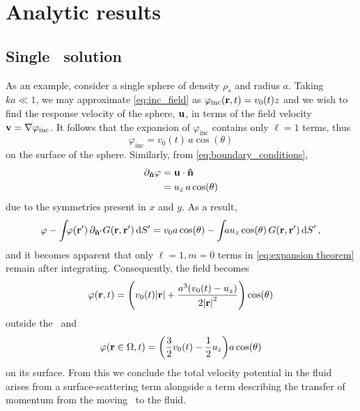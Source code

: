 \section{Analytic results}

\subsection{Single \bubble\ solution}

As an example, consider a single sphere of density $\rho_s$ and radius $a$.
Taking $k a \ll 1$, we may approximate \cref{eq:inc_field} as $\varphi_\text{inc}(\vb{r}, t) = v_0(t) z$ and we wish to find the response velocity of the sphere, $\vb{u}$, in terms of the field velocity $\vb{v} = \nabla \varphi_\text{inc}$. It follows that the expansion of $\varphi_\text{inc}$ contains only $\ell = 1$ terms, thus
\begin{equation}
  \label{eq:uniform field}
  \varphi_\text{inc} = v_0(t) \, a \cos(\theta)
\end{equation}
on the surface of the sphere. Similarly, from \cref{eq:boundary_conditions},
\begin{align}
  \partial_{\vu{n}} \varphi &= \vb{u} \cdot \vu{n} \nonumber \\
                            &= u_z \, a \cos(\theta)
\end{align}
due to the symmetries present in $x$ and $y$.
As a result,
\begin{equation}
  \varphi - \int_{} \varphi(\vb{r}') \, \partial_{\vu{n}'} G(\vb{r}, \vb{r}') \dd{S'} = v_0 a \cos(\theta) - \int_{} a u_z \cos(\theta) \, G(\vb{r}, \vb{r}') \dd{S}',
\end{equation}
and it becomes apparent that only $\ell = 1, m = 0$ terms in \cref{eq:expansion theorem} remain after integrating.
Consequently, the field becomes
\begin{equation}
  \label{eq:dipole}
  \varphi(\vb{r}, t) = \qty(v_0(t) \abs{\vb{r}} + \frac{a^3\qty(v_0(t) - u_z)}{2\abs{\vb{r}}^2})\cos(\theta)
\end{equation}
outside the \bubble\ and
\begin{equation}
  \varphi(\vb{r} \in \Omega, t) = \qty(\frac{3}{2}v_0(t) - \frac{1}{2} u_z)a \cos(\theta)
\end{equation}
on its surface.
From this we conclude the total velocity potential in the fluid arises from a surface-scattering term alongside a term describing the transfer of momentum from the moving \bubble\ to the fluid.

